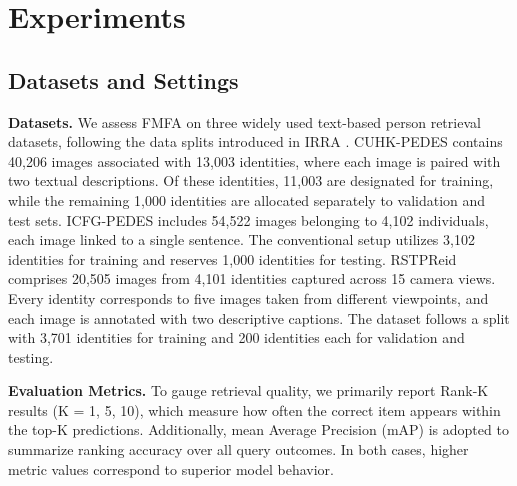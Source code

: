 \documentclass[acmsmall]{acmart}
\begin{document}
\section{Experiments}

\subsection{Datasets and Settings}
\label{sec:setting}


{\bfseries Datasets.} We assess FMFA on three widely used text-based
person retrieval datasets, following the data splits introduced in
IRRA \cite{jiang2023cross}. CUHK-PEDES \cite{li2017person} contains
40,206 images associated with 13,003 identities, where each image is
paired with two textual descriptions. Of these identities, 11,003
are designated for training, while the remaining 1,000 identities
are allocated separately to validation and test sets. ICFG-PEDES
\cite{ding2021semantically} includes 54,522 images belonging to
4,102 individuals, each image linked to a single sentence. The
conventional setup utilizes 3,102 identities for training and
reserves 1,000 identities for testing. RSTPReid \cite{zhu2021dssl}
comprises 20,505 images from 4,101 identities captured across 15
camera views. Every identity corresponds to five images taken from
different viewpoints, and each image is annotated with two
descriptive captions. The dataset follows a split with 3,701
identities for training and 200 identities each for validation and
testing.

{\bfseries Evaluation Metrics.} To gauge retrieval quality, we
primarily report Rank-K results (K = 1, 5, 10), which measure how
often the correct item appears within the top-K predictions.
Additionally, mean Average Precision (mAP) is adopted to summarize
ranking accuracy over all query outcomes. In both cases, higher
metric values correspond to superior model behavior.
\end{document}
